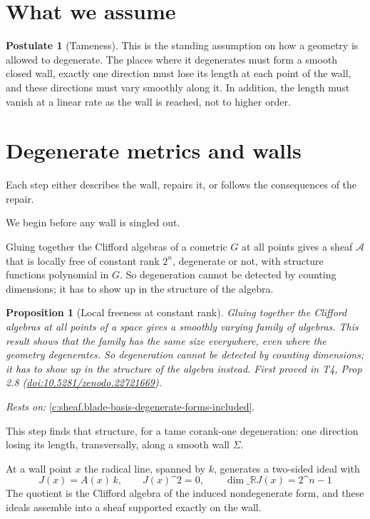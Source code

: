 \documentclass[11pt]{article}
\newtheorem{proposition}[theorem]{Proposition}
\theoremstyle{definition}
\newtheorem{postulate}[theorem]{Postulate}
\theoremstyle{plain}
\providecommand{\R}{}\renewcommand{\R}{\mathbb{R}}
\providecommand{\Sig}{}\renewcommand{\Sig}{\Sigma}
\providecommand{\shA}{}\renewcommand{\shA}{\mathcal{A}}
\begin{document}
\section{What we assume}

\begin{postulate}[Tameness]\label{c:sheaf.tameness}
This is the standing assumption on how a geometry is allowed to degenerate. The places where it degenerates must form a smooth closed wall, exactly one direction must lose its length at each point of the wall, and these directions must vary smoothly along it. In addition, the length must vanish at a linear rate as the wall is reached, not to higher order.
\end{postulate}

\section{Degenerate metrics and walls}

Each step either describes the wall, repairs it, or follows the consequences of the repair.

We begin before any wall is singled out.

Gluing together the Clifford algebras of a cometric $G$ at all points gives a sheaf $\shA$ that is locally free of constant rank $2^n$, degenerate or not, with structure functions polynomial in $G$. So degeneration cannot be detected by counting dimensions; it has to show up in the structure of the algebra.

\begin{proposition}[Local freeness at constant rank]\label{c:sheaf.local-freeness-constant-rank}
Gluing together the Clifford algebras at all points of a space gives a smoothly varying family of algebras. This result shows that the family has the same size everywhere, even where the geometry degenerates. So degeneration cannot be detected by counting dimensions; it has to show up in the structure of the algebra instead.
\emph{First proved in} T4, Prop 2.8 (\href{https://doi.org/10.5281/zenodo.22721669}{doi:10.5281/zenodo.22721669}).
\end{proposition}
\noindent\emph{Rests on:} \ref{c:sheaf.blade-basis-degenerate-forms-included}.

This step finds that structure, for a tame corank-one degeneration: one direction losing its length, transversally, along a smooth wall $\Sig$.

At a wall point $x$ the radical line, spanned by $k$, generates a two-sided ideal with \[ J(x) = A(x)\,k, \qquad J(x)\^{}2 = 0, \qquad \dim\_\R J(x) = 2\^{}{n-1} \] The quotient is the Clifford algebra of the induced nondegenerate form, and these ideals assemble into a sheaf supported exactly on the wall.
\end{document}
